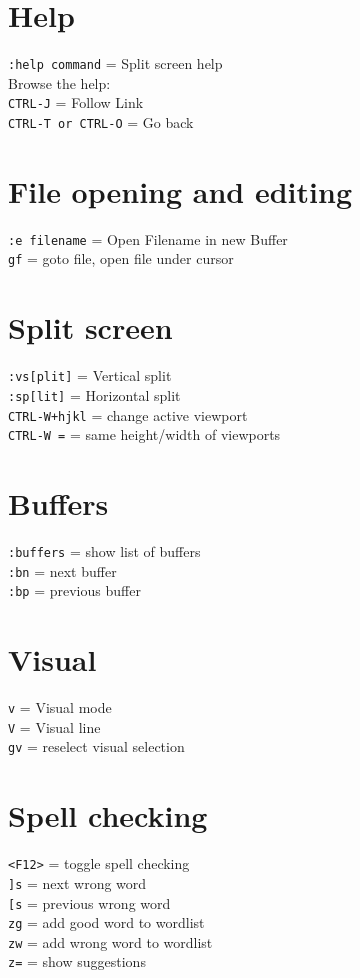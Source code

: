 \documentclass[10pt,DIV=50,landscape,pagesize,parskip=off]{scrartcl}
\newcommand\co[1]{\texttt{#1}}
\newcommand\coe[2]{\co{#1} = #2}
\begin{document}
\begin{multicols}{3}
\section{Help}
\coe{:help command}{Split screen help}\\
Browse the help:\\
\coe{CTRL-J}{Follow Link}\\
\coe{CTRL-T or CTRL-O}{Go back}

\section{File opening and editing}
\coe{:e filename}{Open Filename in new Buffer}\\
\coe{gf}{goto file, open file under cursor}

\section{Split screen}
\coe{:vs[plit]}{Vertical split}\\
\coe{:sp[lit]}{Horizontal split}\\
\coe{CTRL-W+hjkl}{change active viewport}\\
\coe{CTRL-W =}{same height/width of viewports}

\section{Buffers}
\coe{:buffers}{show list of buffers}\\
\coe{:bn}{next buffer}\\
\coe{:bp}{previous buffer}

\section{Visual}
\coe{v}{Visual mode}\\
\coe{V}{Visual line}\\
\coe{gv}{reselect visual selection}

\section{Spell checking}
\coe{<F12>}{toggle spell checking}\\
\coe{]s}{next wrong word}\\
\coe{[s}{previous wrong word}\\
\coe{zg}{add good word to wordlist}\\
\coe{zw}{add wrong word to wordlist}\\
\coe{z=}{show suggestions}


\end{multicols}
\end{document}
